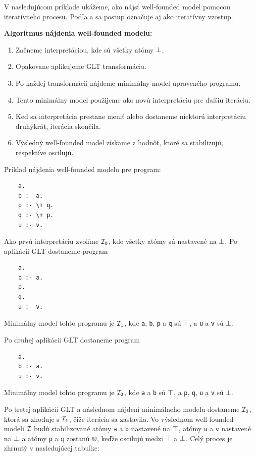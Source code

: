V nasledujúcom príklade ukážeme, ako nájsť well-founded model pomocou iteratívneho procesu. 
Podľa \cite{SemanticsQueries} a \cite{WellFounded} sa postup označuje aj ako iteratívny vzostup.

\vline

\textbf{Algoritmus nájdenia well-founded modelu:}
\begin{enumerate}
\item Začneme interpretáciou, kde sú všetky atómy $\bot$.
\item Opakovane aplikujeme GLT transformáciu.
\item Po každej transformácii nájdeme minimálny model upraveného programu.
\item Tento minimálny model použijeme ako novú interpretáciu pre ďalšiu iteráciu.
\item Keď sa interpretácia prestane meniť alebo dostaneme niektorú interpretáciu druhýkrát, iterácia
skončila.
\item Výsledný well-founded model získame z hodnôt, ktoré sa stabilizujú, respektíve oscilujú.
\end{enumerate}

Príklad nájdenia well-founded modelu pre program:
\begin{verbatim}
    a.
    b :- a.
    p :- \+ q.
    q :- \+ p.
    u :- v.
\end{verbatim}

Ako prvú interpretáciu zvolíme $\mathcal{I}_0$, kde všetky atómy sú nastavené na $\bot$. Po aplikácii
GLT dostaneme program
\begin{verbatim}
    a.
    b :- a.
    p.
    q.
    u :- v.
\end{verbatim}
Minimálny model tohto programu je $\mathcal{I}_1$, kde \verb|a|, \verb|b|, \verb|p| a \verb|q| sú
$\top$, a \verb|u| a \verb|v| sú $\bot$.

Po druhej aplikácii GLT dostaneme program
\begin{verbatim}
    a.
    b :- a.
    u :- v.
\end{verbatim}
Minimálny model tohto programu je $\mathcal{I}_2$, kde \verb|a| a \verb|b| sú $\top$, a \verb|p|,
\verb|q|, \verb|u| a \verb|v| sú $\bot$.

Po tretej aplikácii GLT a následnom nájdení minimálneho modelu dostaneme $\mathcal{I}_3$, ktorá sa
zhoduje s $\mathcal{I}_1$, čiže iterácia sa zastavila. Vo výslednom well-founded modeli $\mathcal{I}$ budú
stabilizované atómy \verb|a| a \verb|b| nastavené na $\top$, atómy \verb|u| a \verb|v| nastavené na
$\bot$ a atómy \verb|p| a \verb|q| zostanú $\Cup$, keďže oscilujú medzi $\top$ a $\bot$.
Celý proces je zhrnutý v nasledujúcej tabuľke:

